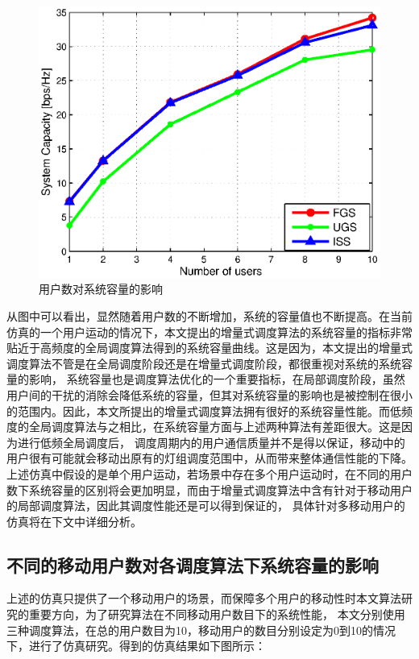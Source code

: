 \begin{figure}[htbp]
    \centering
	\includegraphics[width=\textwidth]{figures/chapter-5/Usernum2Capacity.eps}
	\caption{用户数对系统容量的影响}
	\label{fig:usernum-2-capacity}
\end{figure}

从图中可以看出，显然随着用户数的不断增加，系统的容量值也不断提高。在当前仿真的一个用户运动的情况下，本文提出的增量式调度算法的系统容量的指标非常贴近于高频度的全局调度算法得到的系统容量曲线。这是因为，本文提出的增量式调度算法不管是在全局调度阶段还是在增量式调度阶段，都很重视对系统的系统容量的影响，
系统容量也是调度算法优化的一个重要指标，在局部调度阶段，虽然用户间的干扰的消除会降低系统的容量，但其对系统容量的影响也是被控制在很小的范围内。因此，本文所提出的增量式调度算法拥有很好的系统容量性能。而低频度的全局调度算法与之相比，在系统容量方面与上述两种算法有差距很大。这是因为进行低频全局调度后，
调度周期内的用户通信质量并不是得以保证，移动中的用户很有可能就会移动出原有的灯组调度范围中，从而带来整体通信性能的下降。上述仿真中假设的是单个用户运动，若场景中存在多个用户运动时，在不同的用户数下系统容量的区别将会更加明显，而由于增量式调度算法中含有针对于移动用户的局部调度算法，因此其调度性能还是可以得到保证的，
具体针对多移动用户的仿真将在下文中详细分析。

\subsection{不同的移动用户数对各调度算法下系统容量的影响}
上述的仿真只提供了一个移动用户的场景，而保障多个用户的移动性时本文算法研究的重要方向，为了研究算法在不同移动用户数目下的系统性能，
本文分别使用三种调度算法，在总的用户数目为10，移动用户的数目分别设定为0到10的情况下，进行了仿真研究。得到的仿真结果如下图所示：

